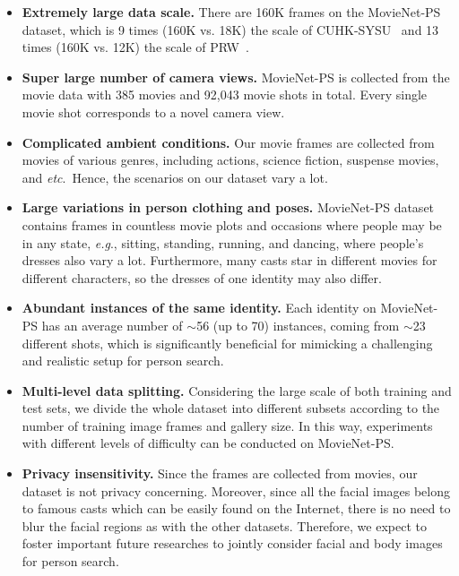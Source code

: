 \documentclass{article}
\def\eg{\emph{e.g}.} \def\Eg{\emph{E.g}.}
\def\etc{\emph{etc}.} \def\vs{\emph{vs}.}
\begin{document}
\begin{itemize}
    \item \textbf{Extremely large data scale.} There are 160K frames on the MovieNet-PS dataset, which is 9 times (160K vs. 18K) the scale of CUHK-SYSU~\cite{OIM} and 13 times (160K vs. 12K) the scale of PRW~\cite{PRW}.

    \item \textbf{Super large number of camera views.} MovieNet-PS is collected from the movie data with 385 movies and 92,043 movie shots in total. Every single movie shot corresponds to a novel camera view.

    \item \textbf{Complicated ambient conditions.} Our movie frames are collected from movies of various genres, including actions, science fiction, suspense movies, and \etc{}~Hence, the scenarios on our dataset vary a lot.

    \item \textbf{Large variations in person clothing and poses.} MovieNet-PS dataset contains frames in countless movie plots and occasions where people may be in any state, \eg, sitting, standing, running, and dancing, where people's dresses also vary a lot. Furthermore, many casts star in different movies for different characters, so the dresses of one identity may also differ.

    \item \textbf{Abundant instances of the same identity.} Each identity on MovieNet-PS has an average number of $\sim$56 (up to 70) instances, coming from $\sim$23 different shots, which is significantly beneficial for mimicking a challenging and realistic setup for person search.
    
    \item \textbf{Multi-level data splitting.} Considering the large scale of both training and test sets, we divide the whole dataset into different subsets according to the number of training image frames and gallery size. In this way, experiments with different levels of difficulty can be conducted on MovieNet-PS.
    
    \item \textbf{Privacy insensitivity.} Since the frames are collected from movies, our dataset is not privacy concerning. Moreover, since all the facial images belong to famous casts which can be easily found on the Internet, there is no need to blur the facial regions as with the other datasets. Therefore, we expect to foster important future researches to jointly consider facial and body images for person search.
    
\end{itemize}
\end{document}

